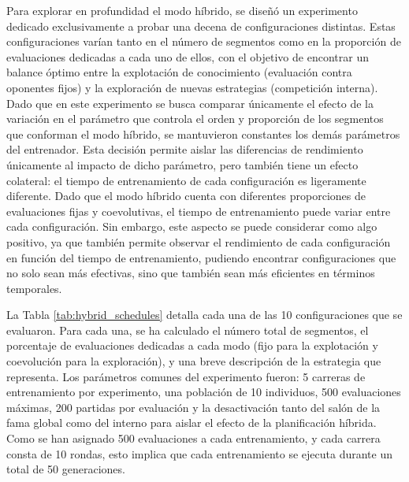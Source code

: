Para explorar en profundidad el modo híbrido, se diseñó un experimento dedicado exclusivamente a probar una decena de configuraciones distintas. Estas configuraciones varían tanto en el número de segmentos como en la proporción de evaluaciones dedicadas a cada uno de ellos, con el objetivo de encontrar un balance óptimo entre la explotación de conocimiento (evaluación contra oponentes fijos) y la exploración de nuevas estrategias (competición interna). Dado que en este experimento se busca comparar únicamente el efecto de la variación en el parámetro que controla el orden y proporción de los segmentos que conforman el modo híbrido, se mantuvieron constantes los demás parámetros del entrenador. Esta decisión permite aislar las diferencias de rendimiento únicamente al impacto de dicho parámetro, pero también tiene un efecto colateral: el tiempo de entrenamiento de cada configuración es ligeramente diferente. Dado que el modo híbrido cuenta con diferentes proporciones de evaluaciones fijas y coevolutivas, el tiempo de entrenamiento puede variar entre cada configuración. Sin embargo, este aspecto se puede considerar como algo positivo, ya que también permite observar el rendimiento de cada configuración en función del tiempo de entrenamiento, pudiendo encontrar configuraciones que no solo sean más efectivas, sino que también sean más eficientes en términos temporales.

La Tabla \ref{tab:hybrid_schedules} detalla cada una de las 10 configuraciones que se evaluaron. Para cada una, se ha calculado el número total de segmentos, el porcentaje de evaluaciones dedicadas a cada modo (fijo para la explotación y coevolución para la exploración), y una breve descripción de la estrategia que representa. Los parámetros comunes del experimento fueron: 5 carreras de entrenamiento por experimento, una población de 10 individuos, 500 evaluaciones máximas, 200 partidas por evaluación y la desactivación tanto del salón de la fama global como del interno para aislar el efecto de la planificación híbrida. Como se han asignado 500 evaluaciones a cada entrenamiento, y cada carrera consta de 10 rondas, esto implica que cada entrenamiento se ejecuta durante un total de 50 generaciones.

